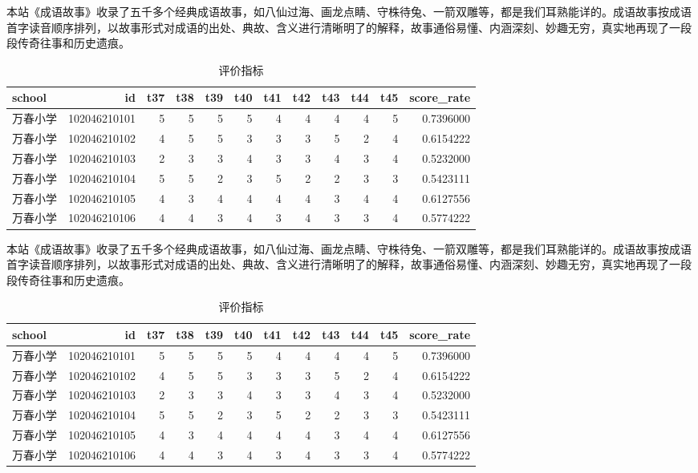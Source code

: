 \documentclass[hyperref, a4paper, UTF8, zihao = -4, linespread = 1]{ctexbook}
\begin{document}
本站《成语故事》收录了五千多个经典成语故事，如八仙过海、画龙点睛、守株待兔、一箭双雕等，都是我们耳熟能详的。成语故事按成语首字读音顺序排列，以故事形式对成语的出处、典故、含义进行清晰明了的解释，故事通俗易懂、内涵深刻、妙趣无穷，真实地再现了一段段传奇往事和历史遗痕。

\begin{table}

\caption{\label{tab:unnamed-chunk-4}评价指标}
\centering
\begin{tabular}[t]{lrrrrrrrrrrr}
\toprule
school & id & t37 & t38 & t39 & t40 & t41 & t42 & t43 & t44 & t45 & score\_rate\\
\midrule
万春小学 & 102046210101 & 5 & 5 & 5 & 5 & 4 & 4 & 4 & 4 & 5 & 0.7396000\\
万春小学 & 102046210102 & 4 & 5 & 5 & 3 & 3 & 3 & 5 & 2 & 4 & 0.6154222\\
万春小学 & 102046210103 & 2 & 3 & 3 & 4 & 3 & 3 & 4 & 3 & 4 & 0.5232000\\
万春小学 & 102046210104 & 5 & 5 & 2 & 3 & 5 & 2 & 2 & 3 & 3 & 0.5423111\\
万春小学 & 102046210105 & 4 & 3 & 4 & 4 & 4 & 4 & 3 & 4 & 4 & 0.6127556\\
\addlinespace
万春小学 & 102046210106 & 4 & 4 & 3 & 4 & 3 & 4 & 3 & 3 & 4 & 0.5774222\\
\bottomrule
\end{tabular}
\end{table}

本站《成语故事》收录了五千多个经典成语故事，如八仙过海、画龙点睛、守株待兔、一箭双雕等，都是我们耳熟能详的。成语故事按成语首字读音顺序排列，以故事形式对成语的出处、典故、含义进行清晰明了的解释，故事通俗易懂、内涵深刻、妙趣无穷，真实地再现了一段段传奇往事和历史遗痕。

\begin{table}

\caption{\label{tab:unnamed-chunk-5}评价指标}
\centering
\begin{tabular}[t]{lrrrrrrrrrrr}
\toprule
school & id & t37 & t38 & t39 & t40 & t41 & t42 & t43 & t44 & t45 & score\_rate\\
\midrule
万春小学 & 102046210101 & 5 & 5 & 5 & 5 & 4 & 4 & 4 & 4 & 5 & 0.7396000\\
万春小学 & 102046210102 & 4 & 5 & 5 & 3 & 3 & 3 & 5 & 2 & 4 & 0.6154222\\
万春小学 & 102046210103 & 2 & 3 & 3 & 4 & 3 & 3 & 4 & 3 & 4 & 0.5232000\\
万春小学 & 102046210104 & 5 & 5 & 2 & 3 & 5 & 2 & 2 & 3 & 3 & 0.5423111\\
万春小学 & 102046210105 & 4 & 3 & 4 & 4 & 4 & 4 & 3 & 4 & 4 & 0.6127556\\
\addlinespace
万春小学 & 102046210106 & 4 & 4 & 3 & 4 & 3 & 4 & 3 & 3 & 4 & 0.5774222\\
\bottomrule
\end{tabular}
\end{table}
\end{document}

